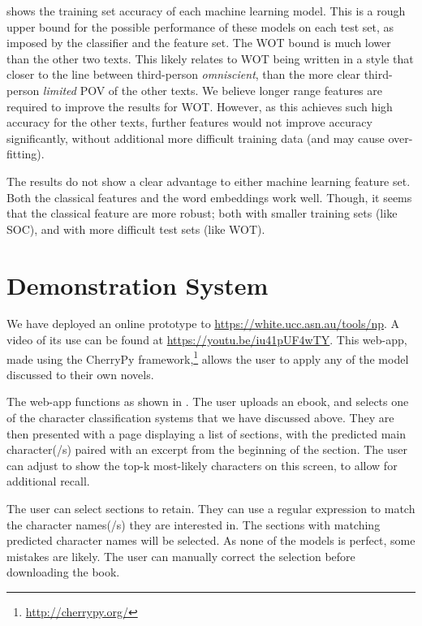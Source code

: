 \documentclass[11pt,a4paper]{article}
\begin{document}
 shows the training set accuracy of each machine learning model.
This is a rough upper bound for the possible performance of these models on each test set, as imposed by the classifier and the feature set.
The WOT bound is much lower than the other two texts.
This likely relates to WOT being written in a style that closer to the line between third-person \emph{omniscient}, than the more clear third-person \emph{limited} POV of the other texts.
We believe longer range features are required to improve the results for WOT.
However, as this achieves such high accuracy for the other texts, further features would not improve accuracy significantly, without additional more difficult training data (and may cause over-fitting).

%
%
The results do not show a clear advantage to either machine learning feature set.
Both the classical features and the word embeddings work well.
Though, it seems that the classical feature are more robust; both with smaller training sets (like SOC), and with more difficult test sets (like WOT).

\section{Demonstration System}\label{sec:demonstration}
We have deployed an online prototype to \url{https://white.ucc.asn.au/tools/np}.
A video of its use can be found at \url{https://youtu.be/iu41pUF4wTY}.
This web-app, made using the CherryPy framework,\footnote{\url{http://cherrypy.org/}}
allows the user to apply any of the model discussed to their own novels.

The web-app functions as shown in .
The user uploads an ebook, and selects one of the character classification systems that we have discussed above.
They are then presented with a page displaying a list of sections,
with the predicted main character(/s) paired with an excerpt from the beginning of the section.
The user can adjust to show the top-k most-likely characters on this screen, to allow for additional recall.

The user can select sections to retain.
They can use a regular expression to match the character names(/s) they are interested in.
The sections with matching predicted character names will be selected.
As none of the models is perfect, some mistakes are likely.
The user can manually correct the selection before downloading the book.
\end{document}
